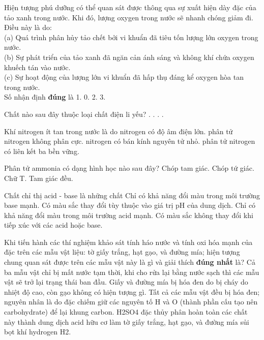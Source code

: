 \documentclass[11pt,a4paper]{article}
\begin{document}
\begin{ex}
Hiện tượng phú dưỡng có thể quan sát được thông qua sự xuất hiện dày đặc của tảo xanh trong nước. Khi đó, lượng oxygen trong nước sẽ nhanh chóng giảm đi. Điều này là do:\\(a) Quá trình phân hủy tảo chết bởi vi khuẩn đã tiêu tốn lượng lớn oxygen trong nước.\\(b) Sự phát triển của tảo xanh đã ngăn cản ánh sáng và không khí chứa oxygen khuếch tán vào nước.\\(c) Sự hoạt động của lượng lớn vi khuẩn đã hấp thụ đáng kể oxygen hòa tan trong nước.\\Số nhận định \textbf{đúng} là
\choice
{1.}
{0.}
{2.}
{3.}
\loigiai{}
\end{ex}
\begin{ex}
Chất nào sau đây thuộc loại chất điện li yếu?
\choice
{.}
{.}
{.}
{.}
\loigiai{}
\end{ex}
\begin{ex}
Khí nitrogen ít tan trong nước là do
\choice
{nitrogen có độ âm điện lớn.}
{phân tử nitrogen không phân cực.}
{nitrogen có bán kính nguyên tử nhỏ.}
{phân tử nitrogen có liên kết ba bền vững.}
\loigiai{}
\end{ex}
\begin{ex}
Phân tử ammonia có dạng hình học nào sau đây?
\choice
{Chóp tam giác.}
{Chóp tứ giác.}
{Chữ T.}
{Tam giác đều.}
\loigiai{}
\end{ex}
\begin{ex}
Chất chỉ thị acid - base là những chất
\choice
{Chỉ có khả năng đổi màu trong môi trường base mạnh.}
{Có màu sắc thay đổi tùy thuộc vào giá trị pH của dung dịch.}
{Chỉ có khả năng đổi màu trong môi trường acid mạnh.}
{Có màu sắc không thay đổi khi tiếp xúc với các acid hoặc base.}
\loigiai{}
\end{ex}
\begin{ex}
Khi tiến hành các thí nghiệm khảo sát tính háo nước và tính oxi hóa mạnh của  đặc trên các mẫu vật liệu: tờ giấy trắng, hạt gạo, và đường mía; hiện tượng chung quan sát được trên các mẫu vật này là gì và giải thích \textbf{đúng nhất} là?
\choice
{Cả ba mẫu vật chỉ bị mất nước tạm thời, khi cho rửa lại bằng nước sạch thì các mẫu vật sẽ trở lại trạng thái ban đầu.}
{Giấy và đường mía bị hóa đen do bị cháy do nhiệt độ cao, còn gạo không có hiện tượng gì.}
{Tất cả các mẫu vật đều bị hóa đen; nguyên nhân là do  đặc chiếm giữ các nguyên tố H và O (thành phần cấu tạo nên carbohydrate) để lại khung carbon.}
{H2SO4 đặc thủy phân hoàn toàn các chất này thành dung dịch acid hữu cơ làm tờ giấy trắng, hạt gạo, và đường mía sủi bọt khí hydrogen H2.}
\loigiai{}
\end{ex}
\end{document}
